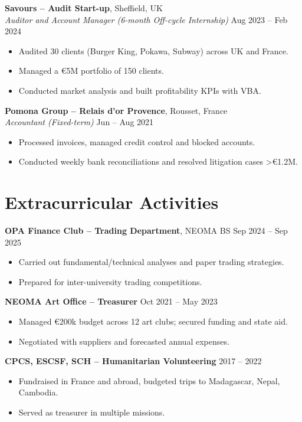 \documentclass[10pt,a4paper]{article}
\begin{document}
\textbf{Savours – Audit Start-up}, Sheffield, UK \\
\textit{Auditor and Account Manager (6-month Off-cycle Internship)} \hfill Aug 2023 – Feb 2024
\begin{itemize}[leftmargin=1.5em, noitemsep]
    \item Audited 30 clients (Burger King, Pokawa, Subway) across UK and France.
    \item Managed a €5M portfolio of 150 clients.
    \item Conducted market analysis and built profitability KPIs with VBA.
\end{itemize}

\textbf{Pomona Group – Relais d’or Provence}, Rousset, France \\
\textit{Accountant (Fixed-term)} \hfill Jun – Aug 2021
\begin{itemize}[leftmargin=1.5em, noitemsep]
    \item Processed invoices, managed credit control and blocked accounts.
    \item Conducted weekly bank reconciliations and resolved litigation cases >€1.2M.
\end{itemize}

\vspace{0.05cm}

\section*{Extracurricular Activities}

\textbf{OPA Finance Club – Trading Department}, NEOMA BS \hfill Sep 2024 – Sep 2025
\begin{itemize}[leftmargin=1.5em, noitemsep]
    \item Carried out fundamental/technical analyses and paper trading strategies.
    \item Prepared for inter-university trading competitions.
\end{itemize}

\textbf{NEOMA Art Office – Treasurer} \hfill Oct 2021 – May 2023
\begin{itemize}[leftmargin=1.5em, noitemsep]
    \item Managed €200k budget across 12 art clubs; secured funding and state aid.
    \item Negotiated with suppliers and forecasted annual expenses.
\end{itemize}

\textbf{CPCS, ESCSF, SCH – Humanitarian Volunteering} \hfill 2017 – 2022
\begin{itemize}[leftmargin=1.5em, noitemsep]
    \item Fundraised in France and abroad, budgeted trips to Madagascar, Nepal, Cambodia.
    \item Served as treasurer in multiple missions.
\end{itemize}
\end{document}
